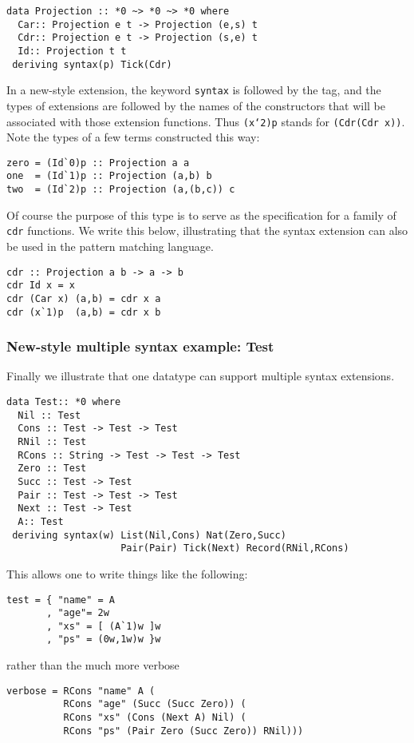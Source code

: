 \documentclass[11pt,twoside]{article}
\begin{document}
\begin{verbatim}
data Projection :: *0 ~> *0 ~> *0 where
  Car:: Projection e t -> Projection (e,s) t
  Cdr:: Projection e t -> Projection (s,e) t
  Id:: Projection t t
 deriving syntax(p) Tick(Cdr) 
\end{verbatim} 

In a new-style extension, the keyword {\tt syntax} is followed by the tag, and the
types of extensions are followed by the names of the constructors that will be associated
with those extension functions. Thus {\tt (x`2)p} stands for {\tt (Cdr(Cdr x))}.
Note the types of a few terms constructed this way:

\begin{verbatim}
zero = (Id`0)p :: Projection a a
one  = (Id`1)p :: Projection (a,b) b
two  = (Id`2)p :: Projection (a,(b,c)) c
\end{verbatim} 

Of course the purpose of this type is to serve as the specification for a family
of {\tt cdr} functions. We write this below, illustrating that the syntax extension
can also be used in the pattern matching language.

\begin{verbatim} 
cdr :: Projection a b -> a -> b
cdr Id x = x
cdr (Car x) (a,b) = cdr x a
cdr (x`1)p  (a,b) = cdr x b
\end{verbatim} 

\subsubsection{New-style multiple syntax example: Test}

Finally we illustrate that one datatype can support multiple syntax extensions.


\begin{verbatim}
data Test:: *0 where
  Nil :: Test
  Cons :: Test -> Test -> Test
  RNil :: Test
  RCons :: String -> Test -> Test -> Test
  Zero :: Test
  Succ :: Test -> Test
  Pair :: Test -> Test -> Test
  Next :: Test -> Test
  A:: Test
 deriving syntax(w) List(Nil,Cons) Nat(Zero,Succ) 
                    Pair(Pair) Tick(Next) Record(RNil,RCons)
\end{verbatim}
This allows one to write things like the following:

\begin{verbatim}
test = { "name" = A
       , "age"= 2w
       , "xs" = [ (A`1)w ]w
       , "ps" = (0w,1w)w }w
\end{verbatim}
rather than the much more verbose
\begin{verbatim}
verbose = RCons "name" A (
          RCons "age" (Succ (Succ Zero)) (
          RCons "xs" (Cons (Next A) Nil) (
          RCons "ps" (Pair Zero (Succ Zero)) RNil)))
\end{verbatim}
\end{document}
